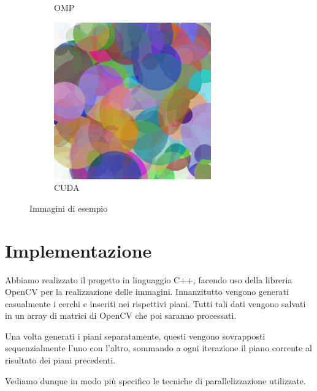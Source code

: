 \documentclass[11pt]{article}
\begin{document}
\begin{figure}[h!]
\begin{subfigure}{0.32\textwidth}
            \caption{OMP}
        \end{subfigure}%
        \hfill
        \begin{subfigure}{0.32\textwidth}
            \centering
            \includegraphics[width=\textwidth]{img/cuda/10000}
            \caption{CUDA}
        \end{subfigure}
        \caption{Immagini di esempio}
        \label{fig:example-images}
    \end{figure}

    \section{Implementazione}
    Abbiamo realizzato il progetto in linguaggio C++, facendo uso della libreria OpenCV per la realizzazione delle immagini.
    Innanzitutto vengono generati casualmente i cerchi e inseriti nei rispettivi piani.
    Tutti tali dati vengono salvati in un array di matrici di OpenCV che poi saranno processati.
    
    Una volta generati i piani separatamente, questi vengono sovrapposti sequenzialmente l'uno con l'altro, sommando a ogni iterazione il piano corrente al risultato dei piani precedenti.
    
    Vediamo dunque in modo più specifico le tecniche di parallelizzazione utilizzate.
\end{document}
